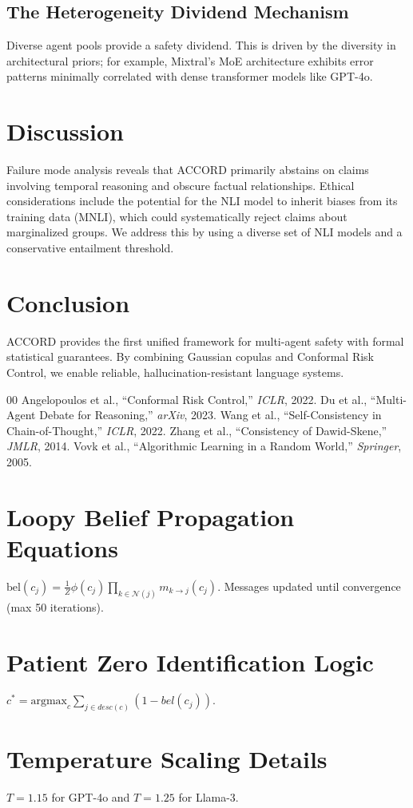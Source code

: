\documentclass[conference]{IEEEtran}
\begin{document}
\subsection{The Heterogeneity Dividend Mechanism}
Diverse agent pools provide a safety dividend. This is driven by the diversity in architectural priors; for example, Mixtral's MoE architecture exhibits error patterns minimally correlated with dense transformer models like GPT-4o.

\section{Discussion}
Failure mode analysis reveals that ACCORD primarily abstains on claims involving temporal reasoning and obscure factual relationships. Ethical considerations include the potential for the NLI model to inherit biases from its training data (MNLI), which could systematically reject claims about marginalized groups. We address this by using a diverse set of NLI models and a conservative entailment threshold.

\section{Conclusion}
ACCORD provides the first unified framework for multi-agent safety with formal statistical guarantees. By combining Gaussian copulas and Conformal Risk Control, we enable reliable, hallucination-resistant language systems.

\begin{thebibliography}{00}
 Angelopoulos et al., ``Conformal Risk Control,'' \textit{ICLR}, 2022.
 Du et al., ``Multi-Agent Debate for Reasoning,'' \textit{arXiv}, 2023.
 Wang et al., ``Self-Consistency in Chain-of-Thought,'' \textit{ICLR}, 2022.
 Zhang et al., ``Consistency of Dawid-Skene,'' \textit{JMLR}, 2014.
 Vovk et al., ``Algorithmic Learning in a Random World,'' \textit{Springer}, 2005.
\end{thebibliography}

\appendix
\section{Loopy Belief Propagation Equations}
$\text{bel}(c_j) = \frac{1}{Z} \phi(c_j) \prod_{k \in \mathcal{N}(j)} m_{k \to j}(c_j)$. Messages updated until convergence (max 50 iterations).

\section{Patient Zero Identification Logic}
$c^* = \text{argmax}_{c} \sum_{j \in desc(c)} (1 - bel(c_j))$.

\section{Temperature Scaling Details}
$T=1.15$ for GPT-4o and $T=1.25$ for Llama-3.
\end{document}

